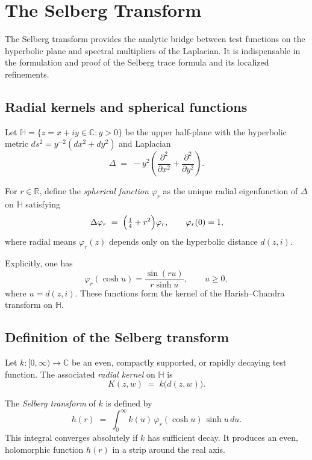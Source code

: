 
\section{The Selberg Transform}
\label{sec:selberg-transform}

The Selberg transform provides the analytic bridge
between test functions on the hyperbolic plane
and spectral multipliers of the Laplacian.
It is indispensable in the formulation and proof
of the Selberg trace formula and its localized refinements.

\subsection{Radial kernels and spherical functions}

Let $\mathbb{H} = \{z = x+iy \in \mathbb{C} : y>0\}$ be the upper half-plane
with the hyperbolic metric $ds^2 = y^{-2}(dx^2+dy^2)$
and Laplacian
\[
  \Delta \;=\; -y^2\!\left(\frac{\partial^2}{\partial x^2}
  + \frac{\partial^2}{\partial y^2}\right).
\]

For $r \in \mathbb{R}$,
define the \emph{spherical function} $\varphi_r$
as the unique radial eigenfunction of $\Delta$ on $\mathbb{H}$ satisfying
\[
  \Delta \varphi_r \;=\; \Bigl(\tfrac{1}{4}+r^2\Bigr)\varphi_r,
  \qquad \varphi_r(0) = 1,
\]
where radial means $\varphi_r(z)$ depends only on the hyperbolic distance $d(z,i)$.

Explicitly, one has
\[
  \varphi_r(\cosh u) = \frac{\sin(ru)}{r\sinh u}, \qquad u\ge 0,
\]
where $u=d(z,i)$.
These functions form the kernel of the Harish–Chandra transform on $\mathbb{H}$.

\subsection{Definition of the Selberg transform}

Let $k \colon [0,\infty) \to \mathbb{C}$ be an even, compactly supported,
or rapidly decaying test function.
The associated \emph{radial kernel} on $\mathbb{H}$ is
\[
  K(z,w) \;=\; k\!\bigl(d(z,w)\bigr).
\]

The \emph{Selberg transform} of $k$ is defined by
\[
  h(r) \;=\; \int_{0}^{\infty} k(u)\,\varphi_r(\cosh u)\,\sinh u\,du.
\]
This integral converges absolutely if $k$ has sufficient decay.
It produces an even, holomorphic function $h(r)$
in a strip around the real axis.

